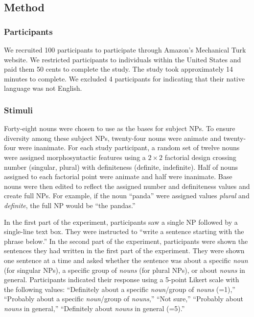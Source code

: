 \documentclass[10pt,letterpaper]{article}
\begin{document}
\subsection{Method}

\subsubsection{Participants} 

We recruited 100 participants to participate through Amazon's Mechanical Turk website. We restricted participants to individuals within the United States and paid them 50 cents to complete the study. The study took approximately 14 minutes to complete. We excluded 4 participants for indicating that their native language was not English.

\subsubsection{Stimuli}  

Forty-eight nouns were chosen to use as the bases for subject NPs. To ensure diversity among these subject NPs, twenty-four nouns were animate and twenty-four were inanimate. For each study participant, a random set of twelve nouns were assigned morphosyntactic features using a \(2 \times 2\) factorial design crossing number (singular, plural) with definiteness (definite, indefinite). Half of nouns assigned to each factorial point were animate and half were inanimate. Base nouns were then edited to reflect the assigned number and definiteness values and create full NPs. For example, if the noun ``panda'' were assigned values \textit{plural} and \textit{definite}, the full NP would be ``the pandas.''

In the first part of the experiment, participants saw a single NP followed by a single-line text box. They were instructed to ``write a sentence starting with the phrase below.'' In the second part of the experiment, participants were shown the sentences they had written in the first part of the experiment. They were shown one sentence at a time and asked whether the sentence was about a specific \textit{noun} (for singular NPs), a specific group of \textit{nouns} (for plural NPs), or about \textit{nouns} in general. Participants indicated their response using a 5-point Likert scale with the following values: ``Definitely about a specific \textit{noun}/group of \textit{nouns} (=1),'' ``Probably about a specific \textit{noun}/group of \textit{nouns},'' ``Not sure,'' ``Probably about \textit{nouns} in general,'' ``Definitely about \textit{nouns} in general (=5).''
\end{document}
